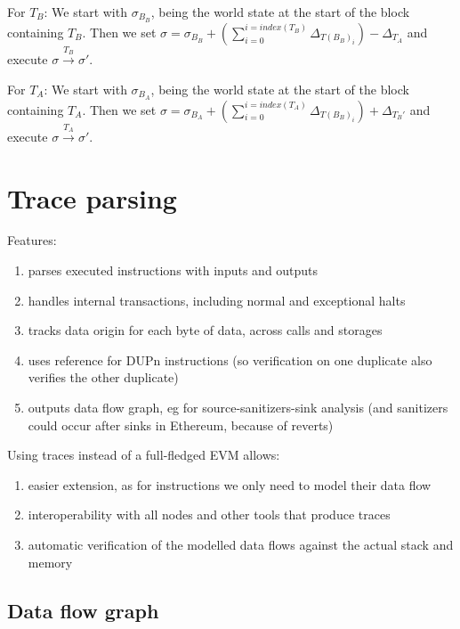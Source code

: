 \documentclass[draft,final]{vutinfth} %
\begin{document}
    For $T_B$: We start with $\sigma_{B_B}$, being the world state at the start of the block containing $T_B$. Then we set $\sigma = \sigma_{B_B} + (\sum_{i=0}^{i=index(T_B)}\Delta_{T(B_B)_i}) - \Delta_{T_A}$ and execute $\sigma \xrightarrow{T_B} \sigma\prime$.

    For $T_A$: We start with $\sigma_{B_A}$, being the world state at the start of the block containing $T_A$. Then we set $\sigma = \sigma_{B_A} + (\sum_{i=0}^{i=index(T_A)}\Delta_{T(B_B)_i}) + \Delta_{T_B\prime}$ and execute $\sigma \xrightarrow{T_A} \sigma\prime$.

    \section{Trace parsing}

    Features:

    \begin{enumerate}
        \item parses executed instructions with inputs and outputs
        \item handles internal transactions, including normal and exceptional halts
        \item tracks data origin for each byte of data, across calls and storages
        \item uses reference for DUPn instructions (so verification on one duplicate also verifies the other duplicate)
        \item outputs data flow graph, eg for source-sanitizers-sink analysis (and sanitizers could occur after sinks in Ethereum, because of reverts)
    \end{enumerate}

    Using traces instead of a full-fledged EVM allows:

    \begin{enumerate}
        \item easier extension, as for instructions we only need to model their data flow
        \item interoperability with all nodes and other tools that produce traces
        \item automatic verification of the modelled data flows against the actual stack and memory
    \end{enumerate}

    \subsection{Data flow graph}
\end{document}
